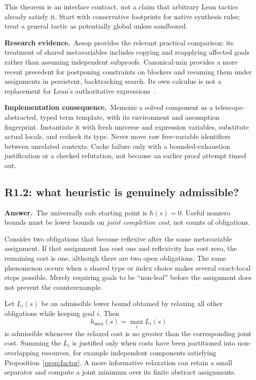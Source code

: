 \documentclass[11pt,a4paper]{article}
\theoremstyle{definition}
\theoremstyle{remark}
\newcommand{\ans}{\noindent\textbf{Answer.}\ }
\newcommand{\imp}{\par\noindent\textbf{Implementation consequence.}\ }
\newcommand{\lit}{\par\noindent\textbf{Research evidence.}\ }
\begin{document}
This theorem is an interface contract, not a claim that arbitrary Lean tactics
already satisfy it. Start with conservative footprints for native synthesis
rules; treat a general tactic as potentially global unless sandboxed.

\lit Aesop provides the relevant practical comparison: its treatment of shared
metavariables includes copying and reapplying affected goals rather than
assuming independent subproofs. Canonical-min provides a more recent precedent
for postponing constraints on blockers and resuming them under assignments in
persistent, backtracking search. Its own calculus is not a replacement for
Lean's authoritative expressions~\cite{aesop,canonical-min}.

\imp Memoize a solved component as a telescope-abstracted, typed term template,
with its environment and assumption fingerprint. Instantiate it with fresh
universe and expression variables, substitute actual locals, and recheck its
type. Never move raw free-variable identifiers between unrelated contexts.
Cache failure only with a bounded-exhaustion justification or a checked
refutation, not because an earlier proof attempt timed out.

\subsection{R1.2: what heuristic is genuinely admissible?}\label{q:R1.2}
\ans The universally safe starting point is $h(s)=0$. Useful nonzero bounds
must be lower bounds on \emph{joint completion cost}, not counts of obligations.

Consider two obligations that become reflexive after the same metavariable
assignment. If that assignment has cost one and reflexivity has cost zero,
the remaining cost is one, although there are two open obligations. The same
phenomenon occurs when a shared type or index choice makes several exact-local
steps possible. Merely requiring goals to be ``non-leaf'' before the assignment
does not prevent the counterexample.

Let $L_i(s)$ be an admissible lower bound obtained by relaxing all other
obligations while keeping goal $i$. Then
\[
 h_{\max}(s)=\max_i L_i(s)
\]
is admissible whenever the relaxed cost is no greater than the corresponding
joint cost. Summing the $L_i$ is justified only when costs have been partitioned
into non-overlapping resources, for example independent components satisfying
Proposition~\ref{prop:factor}. A more informative relaxation can retain a small
separator and compute a joint minimum over its finite abstract assignments.
\end{document}
